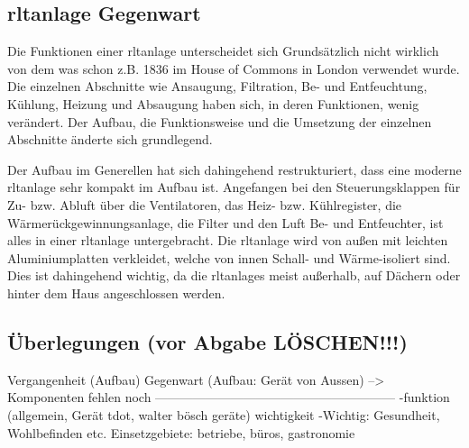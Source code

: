 \subsection{\ac{rltanlage} Gegenwart}
Die Funktionen einer \ac{rltanlage} unterscheidet sich Grundsätzlich nicht wirklich von dem was schon z.B. 1836 im House of Commons in London verwendet wurde. Die einzelnen Abschnitte wie \zB Ansaugung, Filtration, Be- und Entfeuchtung, Kühlung, Heizung und Absaugung haben sich, in deren Funktionen, wenig verändert. Der Aufbau, die Funktionsweise und die Umsetzung der einzelnen Abschnitte änderte sich  grundlegend.

Der Aufbau im Generellen hat sich dahingehend restrukturiert, dass eine moderne \ac{rltanlage} sehr kompakt im Aufbau ist. Angefangen bei den Steuerungsklappen für Zu- bzw. Abluft über die Ventilatoren, das Heiz- bzw. Kühlregister, die Wärmerückgewinnungsanlage, die Filter und den Luft Be- und Entfeuchter, ist alles in einer \ac{rltanlage} untergebracht.
Die \ac{rltanlage} wird von außen mit leichten Aluminiumplatten verkleidet, welche von innen Schall- und Wärme-isoliert sind. Dies ist dahingehend wichtig, da die \acp{rltanlage} meist außerhalb, \zB auf Dächern oder hinter dem Haus angeschlossen werden. 







\subsection{Überlegungen (vor Abgabe LÖSCHEN!!!)} 

Vergangenheit (Aufbau)
Gegenwart (Aufbau: Gerät von Aussen) --> Komponenten fehlen noch
---------------------------------------------------------
-funktion (allgemein, Gerät tdot, walter bösch geräte)
wichtigkeit 
-Wichtig: Gesundheit, Wohlbefinden etc.
Einsetzgebiete: betriebe, büros, gastronomie

